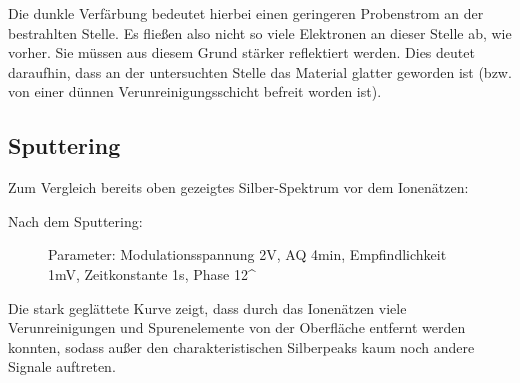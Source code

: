 	Die dunkle Verfärbung bedeutet hierbei einen geringeren Probenstrom an der bestrahlten Stelle.
	Es fließen also nicht so viele Elektronen an dieser Stelle ab, wie vorher.
	Sie müssen aus diesem Grund stärker reflektiert werden.
	Dies deutet daraufhin, dass an der untersuchten Stelle das Material glatter geworden ist (bzw. von einer dünnen Verunreinigungsschicht befreit worden ist).


\newpage

\subsection{Sputtering} %
\label{sub:sputtering}

	Zum Vergleich bereits oben gezeigtes Silber-Spektrum vor dem Ionenätzen:

	\begin{figure}[H]
		\center
		
	\end{figure}

	Nach dem Sputtering:

	\begin{figure}[H]
		\center
		
		\caption{\centering Parameter: Modulationsspannung 2V, AQ 4min, Empfindlichkeit 1mV, Zeitkonstante 1s, Phase 12^\circ }
	\end{figure}

	Die stark geglättete Kurve zeigt, dass durch das Ionenätzen viele Verunreinigungen und Spurenelemente von der Oberfläche entfernt werden konnten, 
	sodass außer den charakteristischen Silberpeaks kaum noch andere Signale auftreten.


